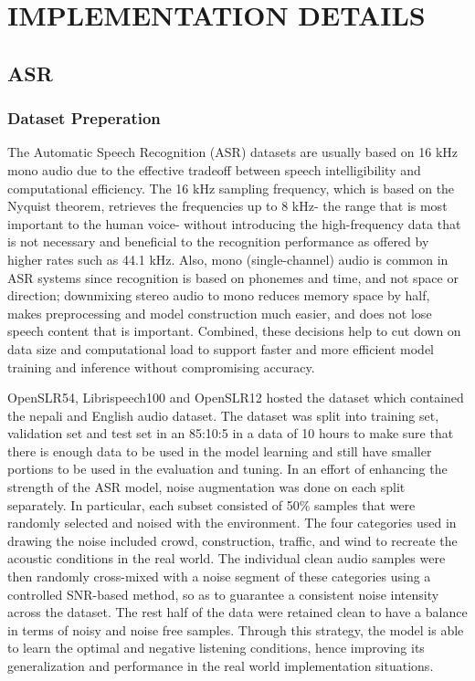 \newpage
\section{\MakeUppercase{Implementation Details}}
\subsection{ASR}
\subsubsection{Dataset Preperation}
The Automatic Speech Recognition (ASR) datasets are usually based on 16 kHz mono audio due to the effective tradeoff between speech intelligibility and computational efficiency. The 16 kHz sampling frequency, which is based on the Nyquist theorem, retrieves the frequencies up to 8 kHz- the range that is most important to the human voice- without introducing the high-frequency data that is not necessary and beneficial to the recognition performance as offered by higher rates such as 44.1 kHz. Also, mono (single-channel) audio is common in ASR systems since recognition is based on phonemes and time, and not space or direction; downmixing stereo audio to mono reduces memory space by half, makes preprocessing and model construction much easier, and does not lose speech content that is important. Combined, these decisions help to cut down on data size and computational load to support faster and more efficient model training and inference without compromising accuracy.

OpenSLR54, Librispeech100 and OpenSLR12 hosted the dataset which contained the nepali and English audio dataset. The dataset was split into training set, validation set and test set in an 85:10:5 in a data of 10 hours to make sure that there is enough data to be used in the model learning and still have smaller portions to be used in the evaluation and tuning. In an effort of enhancing the strength of the ASR model, noise augmentation was done on each split separately. In particular, each subset consisted of 50\% samples that were randomly selected and noised with the environment. The four categories used in drawing the noise included crowd, construction, traffic, and wind to recreate the acoustic conditions in the real world. The individual clean audio samples were then randomly cross-mixed with a noise segment of these categories using a controlled SNR-based method, so as to guarantee a consistent noise intensity across the dataset. The rest half of the data were retained clean to have a balance in terms of noisy and noise free samples. Through this strategy, the model is able to learn the optimal and negative listening conditions, hence improving its generalization and performance in the real world implementation situations.

